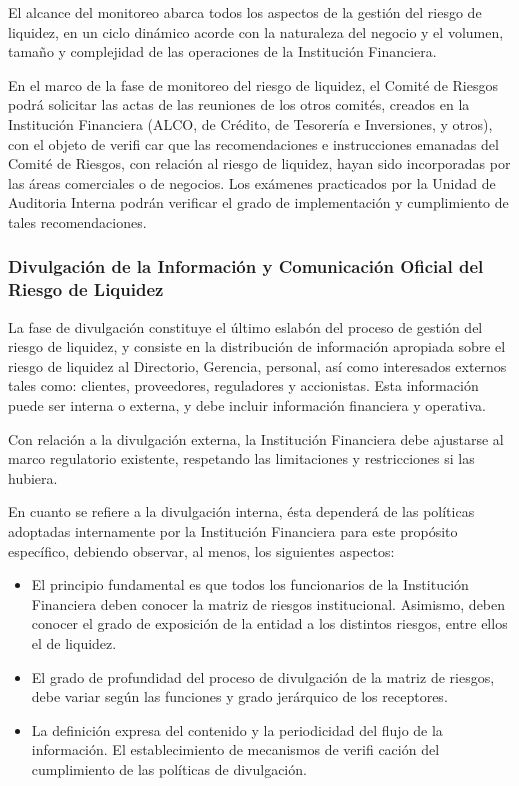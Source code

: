 \documentclass[10pt,]{article}
\begin{document}
El alcance del monitoreo abarca todos los aspectos de la gestión del
riesgo de liquidez, en un ciclo dinámico acorde con la naturaleza del
negocio y el volumen, tamaño y complejidad de las operaciones de la
Institución Financiera.

En el marco de la fase de monitoreo del riesgo de liquidez, el Comité de
Riesgos podrá solicitar las actas de las reuniones de los otros comités,
creados en la Institución Financiera (ALCO, de Crédito, de Tesorería e
Inversiones, y otros), con el objeto de verifi car que las
recomendaciones e instrucciones emanadas del Comité de Riesgos, con
relación al riesgo de liquidez, hayan sido incorporadas por las áreas
comerciales o de negocios. Los exámenes practicados por la Unidad de
Auditoria Interna podrán verificar el grado de implementación y
cumplimiento de tales recomendaciones.

\hypertarget{divulgacion-de-la-informacion-y-comunicacion-oficial-del-riesgo-de-liquidez}{%
\subsubsection{Divulgación de la Información y Comunicación Oficial del
Riesgo de
Liquidez}\label{divulgacion-de-la-informacion-y-comunicacion-oficial-del-riesgo-de-liquidez}}

La fase de divulgación constituye el último eslabón del proceso de
gestión del riesgo de liquidez, y consiste en la distribución de
información apropiada sobre el riesgo de liquidez al Directorio,
Gerencia, personal, así como interesados externos tales como: clientes,
proveedores, reguladores y accionistas. Esta información puede ser
interna o externa, y debe incluir información financiera y operativa.

Con relación a la divulgación externa, la Institución Financiera debe
ajustarse al marco regulatorio existente, respetando las limitaciones y
restricciones si las hubiera.

En cuanto se refiere a la divulgación interna, ésta dependerá de las
políticas adoptadas internamente por la Institución Financiera para este
propósito específico, debiendo observar, al menos, los siguientes
aspectos:

\begin{itemize}
\item
  El principio fundamental es que todos los funcionarios de la
  Institución Financiera deben conocer la matriz de riesgos
  institucional. Asimismo, deben conocer el grado de exposición de la
  entidad a los distintos riesgos, entre ellos el de liquidez.
\item
  El grado de profundidad del proceso de divulgación de la matriz de
  riesgos, debe variar según las funciones y grado jerárquico de los
  receptores.
\item
  La definición expresa del contenido y la periodicidad del flujo de la
  información. El establecimiento de mecanismos de verifi cación del
  cumplimiento de las políticas de divulgación.
\end{itemize}
\end{document}
